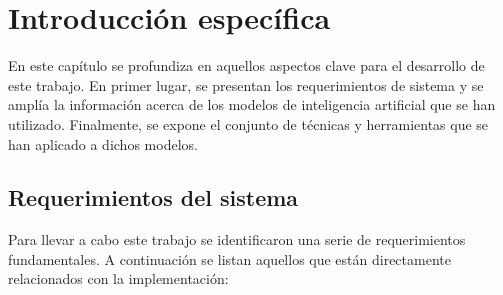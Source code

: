 \chapter{Introducción específica} %

\label{Chapter2}

En este capítulo se profundiza en aquellos aspectos clave para el desarrollo de este trabajo.
En primer lugar, se presentan los requerimientos de sistema y se amplía la información acerca de los modelos de 
inteligencia artificial que se han utilizado.
Finalmente, se expone el conjunto de técnicas y herramientas que se han aplicado a dichos modelos.

\section{Requerimientos del sistema}
Para llevar a cabo este trabajo
se identificaron una serie de requerimientos fundamentales.
A continuación se listan aquellos que están directamente relacionados con la implementación:


